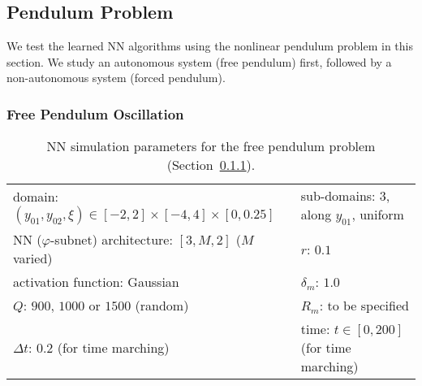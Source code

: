 



\subsection{Pendulum Problem}

We test the learned NN algorithms using
the nonlinear pendulum problem in this section.
We study an autonomous system (free pendulum) first,
followed by a non-autonomous system (forced pendulum).



\subsubsection{Free Pendulum Oscillation}
\label{sec_321}

\begin{table}[tb]
  \centering
  \begin{tabular}{l|l}
    \hline
    domain: $(y_{01},y_{02},\xi)\in [-2,2]\times[-4,4]\times[0,0.25]$
    & sub-domains: 3, along $y_{01}$, uniform\\
    NN ($\varphi$-subnet) architecture: $[3, M, 2]$ ($M$ varied) & $r$: $0.1$ \\
    activation function: Gaussian & $\delta_m$: $1.0$  \\
    $Q$: $900$, $1000$ or $1500$ (random) & $R_m$: to be specified  \\
    $\Delta t$: $0.2$ (for time marching) & time: $t\in[0,200]$ (for time marching) \\
    \hline
  \end{tabular}
  \caption{NN simulation parameters for the free pendulum problem (Section~\ref{sec_321}).
  }
  \label{tab_a3}
\end{table}


